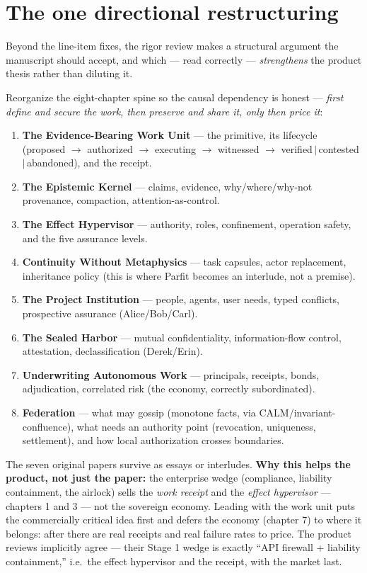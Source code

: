 \documentclass[11pt,a4paper]{article}
\begin{document}
\section{The one directional restructuring}
Beyond the line-item fixes, the rigor review makes a structural argument the manuscript should accept, and which --- read correctly --- \emph{strengthens} the product thesis rather than diluting it.

\begin{move}
Reorganize the eight-chapter spine so the causal dependency is honest --- \emph{first define and secure the work, then preserve and share it, only then price it}:
\begin{enumerate}[leftmargin=1.5em]
\item \textbf{The Evidence-Bearing Work Unit} --- the primitive, its lifecycle (proposed $\to$ authorized $\to$ executing $\to$ witnessed $\to$ verified\,$\mid$\,contested\,$\mid$\,abandoned), and the receipt.
\item \textbf{The Epistemic Kernel} --- claims, evidence, why/where/why-not provenance, compaction, attention-as-control.
\item \textbf{The Effect Hypervisor} --- authority, roles, confinement, operation safety, and the five assurance levels.
\item \textbf{Continuity Without Metaphysics} --- task capsules, actor replacement, inheritance policy (this is where Parfit becomes an interlude, not a premise).
\item \textbf{The Project Institution} --- people, agents, user needs, typed conflicts, prospective assurance (Alice/Bob/Carl).
\item \textbf{The Sealed Harbor} --- mutual confidentiality, information-flow control, attestation, declassification (Derek/Erin).
\item \textbf{Underwriting Autonomous Work} --- principals, receipts, bonds, adjudication, correlated risk (the economy, correctly subordinated).
\item \textbf{Federation} --- what may gossip (monotone facts, via CALM/invariant-confluence), what needs an authority point (revocation, uniqueness, settlement), and how local authorization crosses boundaries.
\end{enumerate}
The seven original papers survive as essays or interludes. \textbf{Why this helps the product, not just the paper:} the enterprise wedge (compliance, liability containment, the airlock) sells the \emph{work receipt} and the \emph{effect hypervisor} --- chapters 1 and 3 --- not the sovereign economy. Leading with the work unit puts the commercially critical idea first and defers the economy (chapter 7) to where it belongs: after there are real receipts and real failure rates to price. The product reviews implicitly agree --- their Stage 1 wedge is exactly ``API firewall + liability containment,'' i.e.\ the effect hypervisor and the receipt, with the market last.
\end{move}
\end{document}
